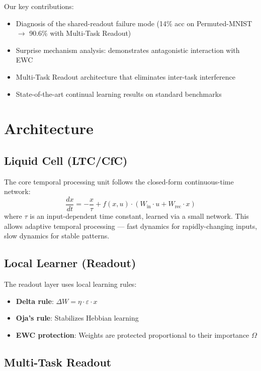 \documentclass[11pt,a4paper]{article}
\begin{document}
Our key contributions:
\begin{itemize}
    \item Diagnosis of the shared-readout failure mode (14\% acc on Permuted-MNIST $\rightarrow$ 90.6\% with Multi-Task Readout)
    \item Surprise mechanism analysis: demonstrates antagonistic interaction with EWC
    \item Multi-Task Readout architecture that eliminates inter-task interference
    \item State-of-the-art continual learning results on standard benchmarks
\end{itemize}

\section{Architecture}

\subsection{Liquid Cell (LTC/CfC)}

The core temporal processing unit follows the closed-form continuous-time network:
\begin{equation}
    \frac{dx}{dt} = -\frac{x}{\tau} + f(x, u) \cdot (W_{\text{in}} \cdot u + W_{\text{rec}} \cdot x)
\end{equation}
where $\tau$ is an input-dependent time constant, learned via a small network.
This allows adaptive temporal processing --- fast dynamics for rapidly-changing inputs, slow dynamics for stable patterns.

\subsection{Local Learner (Readout)}

The readout layer uses local learning rules:
\begin{itemize}
    \item \textbf{Delta rule}: $\Delta W = \eta \cdot \varepsilon \cdot x$
    \item \textbf{Oja's rule}: Stabilizes Hebbian learning
    \item \textbf{EWC protection}: Weights are protected proportional to their importance $\Omega$
\end{itemize}

\subsection{Multi-Task Readout}
\end{document}
